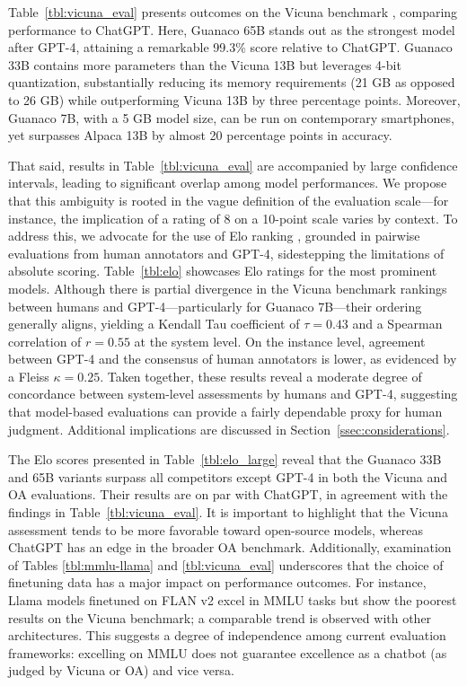 Table~\ref{tbl:vicuna_eval} presents outcomes on the Vicuna benchmark \cite{vicuna2023}, comparing performance to ChatGPT. Here, {Guanaco} 65B stands out as the strongest model after GPT-4, attaining a remarkable 99.3\% score relative to ChatGPT. {Guanaco} 33B contains more parameters than the Vicuna 13B but leverages 4-bit quantization, substantially reducing its memory requirements (21 GB as opposed to 26 GB) while outperforming Vicuna 13B by three percentage points. Moreover, {Guanaco} 7B, with a 5 GB model size, can be run on contemporary smartphones, yet surpasses Alpaca 13B by almost 20 percentage points in accuracy.

That said, results in Table~\ref{tbl:vicuna_eval} are accompanied by large confidence intervals, leading to significant overlap among model performances. We propose that this ambiguity is rooted in the vague definition of the evaluation scale—for instance, the implication of a rating of 8 on a 10-point scale varies by context. To address this, we advocate for the use of Elo ranking \citep{elo1967proposed}, grounded in pairwise evaluations from human annotators and GPT-4, sidestepping the limitations of absolute scoring. Table~\ref{tbl:elo} showcases Elo ratings for the most prominent models. Although there is partial divergence in the Vicuna benchmark rankings between humans and GPT-4—particularly for Guanaco 7B—their ordering generally aligns, yielding a Kendall Tau coefficient of $\tau=0.43$ and a Spearman correlation of $r=0.55$ at the system level. On the instance level, agreement between GPT-4 and the consensus of human annotators is lower, as evidenced by a Fleiss $\kappa=0.25$. Taken together, these results reveal a moderate degree of concordance between system-level assessments by humans and GPT-4, suggesting that model-based evaluations can provide a fairly dependable proxy for human judgment. Additional implications are discussed in Section~\ref{ssec:considerations}.

The Elo scores presented in Table~\ref{tbl:elo_large} reveal that the {Guanaco} 33B and 65B variants surpass all competitors except GPT-4 in both the Vicuna and OA evaluations. Their results are on par with ChatGPT, in agreement with the findings in Table~\ref{tbl:vicuna_eval}. It is important to highlight that the Vicuna assessment tends to be more favorable toward open-source models, whereas ChatGPT has an edge in the broader OA benchmark. Additionally, examination of Tables \ref{tbl:mmlu-llama} and \ref{tbl:vicuna_eval} underscores that the choice of finetuning data has a major impact on performance outcomes. For instance, Llama models finetuned on FLAN v2 excel in MMLU tasks but show the poorest results on the Vicuna benchmark; a comparable trend is observed with other architectures. This suggests a degree of independence among current evaluation frameworks: excelling on MMLU does not guarantee excellence as a chatbot (as judged by Vicuna or OA) and vice versa.

